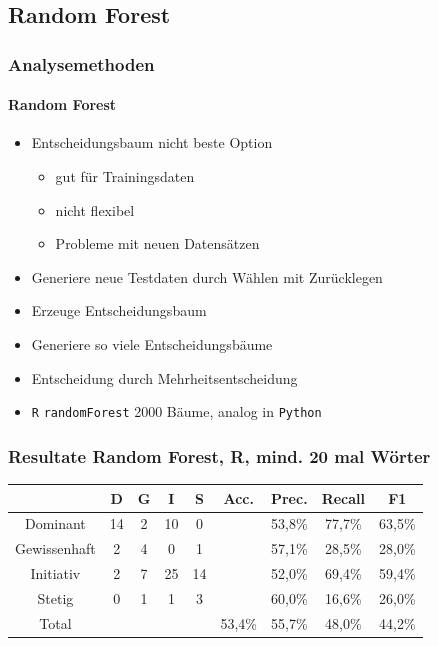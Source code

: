 \subsection{Random Forest}
\begin{frame}
\frametitle{Analysemethoden}
\framesubtitle{Random Forest}
\begin{itemize}\setlength\parskip{12pt}
\item Entscheidungsbaum nicht beste Option
\begin{itemize}
	\item gut für Trainingsdaten
	\item nicht flexibel 
	\item Probleme mit neuen Datensätzen
\end{itemize}
\item Generiere neue Testdaten durch Wählen mit Zurücklegen
\item Erzeuge Entscheidungsbaum
\item Generiere so viele Entscheidungsbäume
\item Entscheidung durch Mehrheitsentscheidung
\item \texttt{R} \texttt{randomForest} 2000 Bäume, analog in  \texttt{Python}
\end{itemize}
\end{frame}
\begin{frame}
\frametitle{Resultate Random Forest, R, mind. 20 mal Wörter}
\begin{center}
\begin{tabular}{|c|c|c|c|c|c|c|c|c|}
\hline
 &  D 	& G	& I & S	& Acc.	& Prec. & Recall	& F1\\
\hline
Dominant & 14 & 2 & 10& 0 &&53,8\% & 77,7\% & 63,5\% \\
Gewissenhaft & 2 & 4 & 0 & 1&&57,1\% & 28,5\% & 28,0\% \\
Initiativ & 2 & 7  & 25 & 14&&52,0\% & 69,4\% & 59,4\% \\
Stetig & 0 & 1 & 1 &  3&&60,0\% & 16,6\% & 26,0\% \\
\hline
Total 	&		&		& & 		& 53,4\%		&   55,7\% & 48,0\% & 44,2\%\\
\hline
\end{tabular}
\end{center}
\end{frame}
